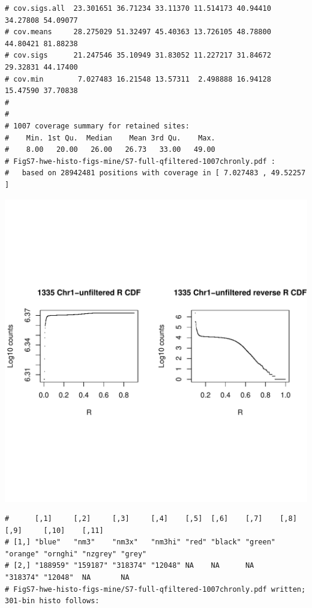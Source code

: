 \documentclass{article}\usepackage[]{graphicx}\usepackage[]{color}
\makeatletter
\def\maxwidth{ %
  \ifdim\Gin@nat@width>\linewidth
    \linewidth
  \else
    \Gin@nat@width
  \fi
}
\newenvironment{kframe}{%
 \def\at@end@of@kframe{}%
 \ifinner\ifhmode%
  \def\at@end@of@kframe{\end{minipage}}%
  \begin{minipage}{\columnwidth}%
 \fi\fi%
 \def\FrameCommand##1{\hskip\@totalleftmargin \hskip-\fboxsep
 \colorbox{shadecolor}{##1}\hskip-\fboxsep
     \hskip-\linewidth \hskip-\@totalleftmargin \hskip\columnwidth}%
 \MakeFramed {\advance\hsize-\width
   \@totalleftmargin\z@ \linewidth\hsize
   \@setminipage}}%
 {\par\unskip\endMakeFramed%
 \at@end@of@kframe}
\newenvironment{knitrout}{}{} %
\makeatother
\begin{document}
\begin{knitrout}
\begin{kframe}
\begin{verbatim}
# cov.sigs.all  23.301651 36.71234 33.11370 11.514173 40.94410 34.27808 54.09077
# cov.means     28.275029 51.32497 45.40363 13.726105 48.78800 44.80421 81.88238
# cov.sigs      21.247546 35.10949 31.83052 11.227217 31.84672 29.32831 44.17400
# cov.min        7.027483 16.21548 13.57311  2.498888 16.94128 15.47590 37.70838
# 
# 
# 1007 coverage summary for retained sites:
#    Min. 1st Qu.  Median    Mean 3rd Qu.    Max. 
#    8.00   20.00   26.00   26.73   33.00   49.00 
# FigS7-hwe-histo-figs-mine/S7-full-qfiltered-1007chronly.pdf :
#   based on 28942481 positions with coverage in [ 7.027483 , 49.52257 ]
\end{verbatim}
\end{kframe}
\includegraphics[width=\maxwidth]{FigS7-hwe-histo-figs-knitr/unnamed-chunk-10-28} 
\begin{kframe}\begin{verbatim}
#      [,1]     [,2]     [,3]     [,4]    [,5]  [,6]    [,7]    [,8]     [,9]     [,10]    [,11] 
# [1,] "blue"   "nm3"    "nm3x"   "nm3hi" "red" "black" "green" "orange" "ornghi" "nzgrey" "grey"
# [2,] "188959" "159187" "318374" "12048" NA    NA      NA      "318374" "12048"  NA       NA    
# FigS7-hwe-histo-figs-mine/S7-full-qfiltered-1007chronly.pdf written; 301-bin histo follows:
\end{verbatim}
\end{kframe}

\end{knitrout}
\end{document}
